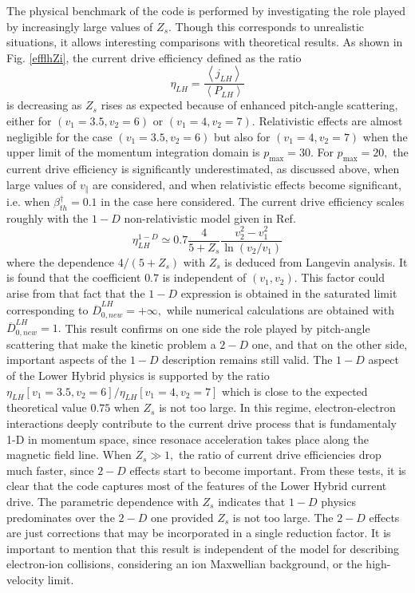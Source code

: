 The physical benchmark of the code is performed by investigating the role
played by increasingly large values of $Z_{s}$. Though this corresponds to
unrealistic situations, it allows interesting comparisons with theoretical
results. As shown in Fig. \ref{efflhZi}, the current drive efficiency
defined as the ratio
\begin{equation}
\eta _{LH}=\frac{\left\langle j_{LH}\right\rangle }{\left\langle
P_{LH}\right\rangle }
\end{equation}
is decreasing as $Z_{s}$ rises as expected because of enhanced pitch-angle
scattering, either for $\left( v_{1}=3.5,v_{2}=6\right) $ or $\left(
v_{1}=4,v_{2}=7\right) .$ Relativistic effects are almost negligible for the
case $\left( v_{1}=3.5,v_{2}=6\right) $ but also for $\left(
v_{1}=4,v_{2}=7\right) $ when the upper limit of the momentum integration
domain is $p_{\max }=30.$ For $p_{\max }=20,$ the current drive efficiency
is significantly underestimated, as discussed above, when large values of $
v_{\Vert }$ are considered, and when relativistic effects become
significant, i.e. when $\beta _{th}^{\dag }=0.1$ in the case here
considered. The current drive efficiency scales roughly with the $1-D$
non-relativistic model given in Ref. \cite{kar86}
\begin{equation}
\eta _{LH}^{1-D}\simeq 0.7\frac{4}{5+Z_{s}}\frac{v_{2}^{2}-v_{1}^{2}}{\ln
\left( v_{2}/v_{1}\right) }
\end{equation}
where the dependence $4/\left( 5+Z_{s}\right) $ with $Z_{s}$ is deduced from
Langevin analysis. It is found that the coefficient $0.7$ is independent of $
\left( v_{1},v_{2}\right) $. This factor could arise from that fact that the
$1-D$ expression is obtained in the saturated limit corresponding to $%
\overline{D}_{0,new}^{LH}=+\infty ,$ while numerical calculations are
obtained with $\overline{D}_{0,new}^{LH}=1.$ This result confirms on one
side the role played by pitch-angle scattering that make the kinetic problem
a $2-D$ one, and that on the other side, important aspects of the $1-D$
description remains still valid. The $1-D$ aspect of the Lower Hybrid
physics is supported by the ratio $\eta _{LH}\left[ v_{1}=3.5,v_{2}=6\right]
/\eta _{LH}\left[ v_{1}=4,v_{2}=7\right] $ which is close to the expected
theoretical value $0.75$ when $Z_{s}$ is not too large. In this regime,
electron-electron interactions deeply contribute to the current drive
process that is fundamentaly 1-D in momentum space, since resonace
acceleration takes place along the magnetic field line. When $Z_{s}\gg 1,$
the ratio of current drive efficiencies drop much faster, since $2-D$
effects start to become important. From these tests, it is clear that the
code captures most of the features of the Lower Hybrid current drive. The
parametric dependence with $Z_{s}$ indicates that $1-D$ physics predominates
over the $2-D$ one provided $Z_{s}$ is not too large. The $2-D$ effects are
just corrections that may be incorporated in a single reduction factor. It
is important to mention that this result is independent of the model for
describing electron-ion collisions, considering an ion Maxwellian
background, or the high-velocity limit.

